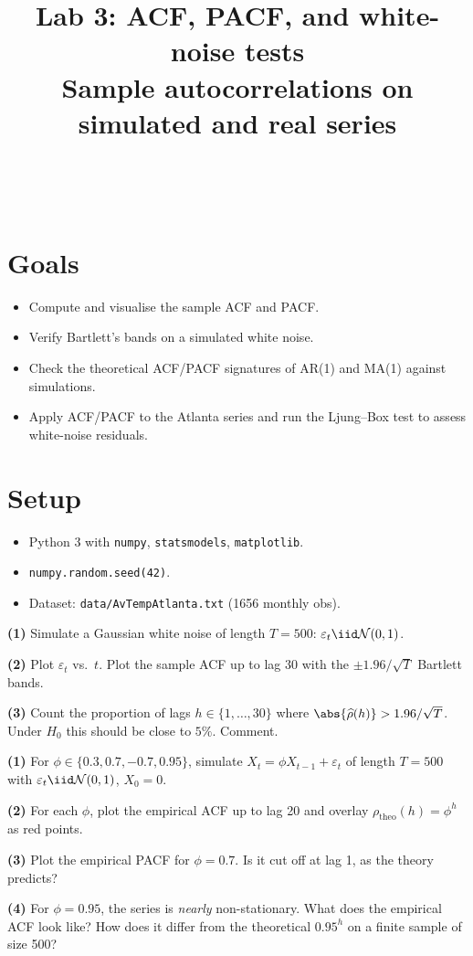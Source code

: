 \documentclass[a4paper,11pt]{article}
\title{Lab 3: ACF, PACF, and white-noise tests\\
\large Sample autocorrelations on simulated and real series}
\author{\auteurNom\\\auteurEmail\\\auteurInstitution}
\date{\anneeUniversitaire}
\begin{document}
\maketitle

\section*{Goals}
\begin{itemize}
  \item Compute and visualise the sample ACF and PACF.
  \item Verify Bartlett's bands on a simulated white noise.
  \item Check the theoretical ACF/PACF signatures of AR(1) and MA(1)
        against simulations.
  \item Apply ACF/PACF to the Atlanta series and run the Ljung--Box
        test to assess white-noise residuals.
\end{itemize}

\section*{Setup}
\begin{itemize}
  \item Python 3 with \texttt{numpy}, \texttt{statsmodels},
        \texttt{matplotlib}.
  \item \texttt{numpy.random.seed(42)}.
  \item Dataset: \texttt{data/AvTempAtlanta.txt} (1656 monthly obs).
\end{itemize}

\begin{exercise}
\textbf{(1)} Simulate a Gaussian white noise of length $T = 500$:
$\varepsilon_t \iid \mathcal{N}(0, 1)$.

\textbf{(2)} Plot $\varepsilon_t$ vs.\ $t$. Plot the sample ACF up to
lag $30$ with the $\pm 1.96 / \sqrt{T}$ Bartlett bands.

\textbf{(3)} Count the proportion of lags $h \in \{1, \dots, 30\}$
where $\abs{\widehat\rho(h)} > 1.96 / \sqrt{T}$. Under $H_0$ this should
be close to $5\%$. Comment.
\end{exercise}

\begin{exercise}
\textbf{(1)} For $\phi \in \{0.3, 0.7, -0.7, 0.95\}$, simulate
$X_t = \phi X_{t-1} + \varepsilon_t$ of length $T = 500$ with
$\varepsilon_t \iid \mathcal{N}(0, 1)$, $X_0 = 0$.

\textbf{(2)} For each $\phi$, plot the empirical ACF up to lag 20 and
overlay $\rho_{\text{theo}}(h) = \phi^h$ as red points.

\textbf{(3)} Plot the empirical PACF for $\phi = 0.7$. Is it cut off
at lag 1, as the theory predicts?

\textbf{(4)} For $\phi = 0.95$, the series is \emph{nearly} non-stationary.
What does the empirical ACF look like? How does it differ from the
theoretical $0.95^h$ on a finite sample of size 500?
\end{exercise}
\end{document}
